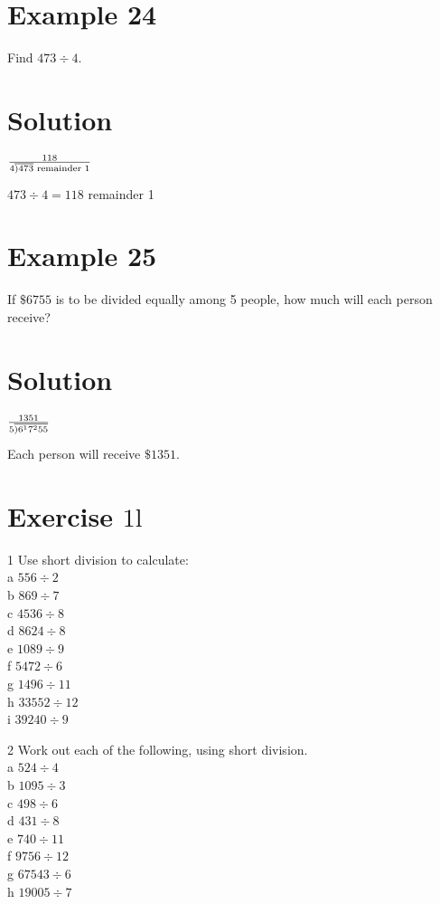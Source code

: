 \documentclass[10pt]{article}
\newcommand\longdiv[1]{\overline{\smash{)}#1}}
\begin{document}
\section*{Example 24}
Find \(473 \div 4\).

\section*{Solution}
\(\frac{118}{4 \longdiv { 4 7 3 } \text { remainder } 1}\)

\(473 \div 4=118\) remainder 1

\section*{Example 25}
If \(\$ 6755\) is to be divided equally among 5 people, how much will each person receive?

\section*{Solution}
\(\frac{1351}{5 \longdiv { 6 ^ { 1 } 7 ^ { 2 } 5 5 }}\)

Each person will receive \(\$ 1351\).

\section*{Exercise \(1 \mathrm{l}\)}
1 Use short division to calculate:\\
a \(556 \div 2\)\\
b \(869 \div 7\)\\
c \(4536 \div 8\)\\
d \(8624 \div 8\)\\
e \(1089 \div 9\)\\
f \(5472 \div 6\)\\
g \(1496 \div 11\)\\
h \(33552 \div 12\)\\
i \(39240 \div 9\)

2 Work out each of the following, using short division.\\
a \(524 \div 4\)\\
b \(1095 \div 3\)\\
c \(498 \div 6\)\\
d \(431 \div 8\)\\
e \(740 \div 11\)\\
f \(9756 \div 12\)\\
g \(67543 \div 6\)\\
h \(19005 \div 7\)
\end{document}
